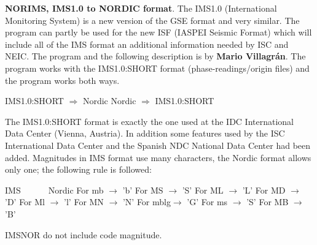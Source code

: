 \textbf{NORIMS, IMS1.0 to NORDIC format}.\newline
{} 
The IMS1.0 (International Monitoring System) is a new version of the GSE format and very similar. The program can partly be used for the new ISF (IASPEI Seismic Format) which will include all of the IMS format an additional information needed by ISC and NEIC. The program and the following description is by \textbf{Mario Villagr\'an}. The program works with the IMS1.0:SHORT format (phase-readings/origin files) and the program works both ways. 

\indent IMS1.0:SHORT $\Rightarrow$ Nordic\newline
\indent Nordic $\Rightarrow$ IMS1.0:SHORT 

The IMS1.0:SHORT format is exactly the one used at the IDC International Data Center (Vienna, Austria). In addition some features used by the ISC International Data Center and the Spanish NDC National Data Center had been added. Magnitudes in IMS format use many characters, the Nordic format allows only one; the following rule is followed: 

IMS \verb|     | Nordic\newline
For mb $\rightarrow$ 'b' \newline
For MS $\rightarrow$ 'S' \newline
For ML $\rightarrow$ 'L' \newline
For MD $\rightarrow$ 'D' \newline
For Ml $\rightarrow$ 'l' \newline
For MN $\rightarrow$ 'N' \newline
For mblg$\rightarrow$ 'G' \newline
For ms $\rightarrow$ 'S' \newline
For MB $\rightarrow$ 'B' 


IMSNOR do not include code magnitude.

